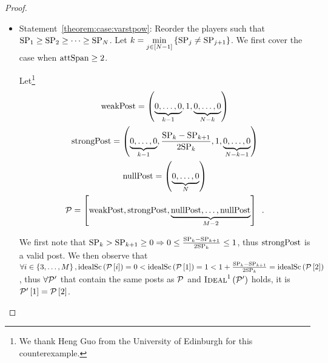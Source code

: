 \begin{proof}
  \begin{itemize}
    \item Statement~\ref{theorem:case:varstpow}: Reorder the players such that
    $\mathrm{SP}_1 \geq \mathrm{SP}_2 \geq \dots \geq \mathrm{SP}_{N}$. Let $k =
    \min\limits_{j \in \left[N - 1\right]}\left\{\mathrm{SP}_j \neq
    \mathrm{SP}_{j+1}\right\}$. We first cover the case when $\mathrm{attSpan} \geq 2$.

    Let\footnote{We thank Heng Guo from the University of Edinburgh for this
    counterexample.}
    \begin{gather*}
      \mathrm{weakPost} = \left(\underbrace{0, \dots, 0}_{k - 1}, 1, \underbrace{0,
      \dots, 0}_{N - k}\right) \\
      \mathrm{strongPost} = \left(\underbrace{0, \dots, 0}_{k - 1}, \frac{\mathrm{SP}_k -
      \mathrm{SP}_{k + 1}}{2\mathrm{SP}_k}, 1, \underbrace{0, \dots, 0}_{N - k -
      1}\right) \\
      \mathrm{nullPost} = \left(\underbrace{0, \dots, 0}_{N}\right) \\
      \mathcal{P} = \left[\mathrm{weakPost}, \mathrm{strongPost}, \underbrace{\mathrm{nullPost}, \dots,
      \mathrm{nullPost}}_{M - 2}\right] \enspace.
    \end{gather*}

    We first note that $\mathrm{SP}_k > \mathrm{SP}_{k+1} \geq 0 \Rightarrow 0 \leq
    \frac{\mathrm{SP}_k - \mathrm{SP}_{k + 1}}{2\mathrm{SP}_k} \leq 1$, thus $\mathrm{strongPost}$ is a
    valid post. We then observe that $\forall i \in \left\{3, \dots,
    M\right\}, \mathrm{idealSc}\left(\mathcal{P}\left[i\right]\right) = 0 <
    \mathrm{idealSc}\left(\mathcal{P}\left[1\right]\right) = 1 < 1 + \frac{\mathrm{SP}_k -
    \mathrm{SP}_{k+1}}{2\mathrm{SP}_k} = \mathrm{idealSc}\left(\mathcal{P}\left[2\right]\right)$, thus $\forall
    \mathcal{P}'$ that contain the same posts as $\mathcal{P}$ and
    $\textsc{Ideal}^1\left(\mathcal{P}'\right)$ holds, it is
    $\mathcal{P}'\left[1\right] = \mathcal{P}\left[2\right]$.


\end{itemize}
\end{proof}
